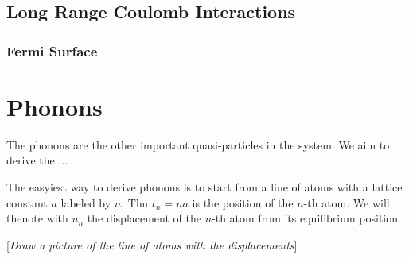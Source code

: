 \subsection{Long Range Coulomb Interactions}

\subsubsection{Fermi Surface}






\section{Phonons}

The phonons are the other important quasi-particles in the system. We aim to derive the ...

The easyiest way to derive phonons is to start from a line of atoms with a lattice constant $a$ labeled by $n$. Thu \(t_n = na\) is the position of the $n$-th atom. We will thenote with \(u_n\) the displacement of the $n$-th atom from its equilibrium position.

    [\textit{Draw a picture of the line of atoms with the displacements}]

